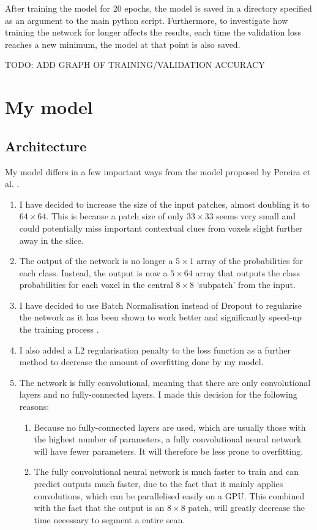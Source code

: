 \documentclass[12pt,a4paper,twoside,openright]{report}
\begin{document}
After training the model for 20 epochs, the model is saved in a directory specified as an argument to the main python script. Furthermore, to investigate how training the network for longer affects the results, each time the validation loss reaches a new minimum, the model at that point is also saved.

TODO: ADD GRAPH OF TRAINING/VALIDATION ACCURACY
\section{My model}
\subsection{Architecture}
My model differs in a few important ways from the model proposed by Pereira et al. \cite{pereira}. 
\begin{enumerate}
	\item I have decided to increase the size of the input patches, almost doubling it to $64 \times 64$. This is because a patch size of only $33 \times 33$ seems very small and could potentially miss important contextual clues from voxels slight further away in the slice.
	\item The output of the network is no longer a $5 \times 1$ array of the probabilities for each class. Instead, the output is now a $5 \times 64$ array that outputs the class probabilities for each voxel in the central $8 \times 8$ `subpatch' from the input. 
	\item I have decided to use Batch Normalisation instead of Dropout to regularise the network as it has been shown to work better and significantly speed-up the training process \cite{batch_normalization}. 
	\item I also added a L2 regularisation penalty to the loss function as a further method to decrease the amount of overfitting done by my model.
	\item The network is fully convolutional, meaning that there are only convolutional layers and no fully-connected layers. I made this decision for the following reasons:
	\begin{enumerate}
		\item Because no fully-connected layers are used, which are usually those with the highest number of parameters, a fully convolutional neural network will have fewer parameters. It will therefore be less prone to overfitting.
		\item The fully convolutional neural network is much faster to train and can predict outputs much faster, due to the fact that it mainly applies convolutions, which can be parallelised easily on a GPU. This combined with the fact that the output is an $8 \times 8$ patch, will greatly decrease the time necessary to segment a entire scan.
	\end{enumerate}
\end{enumerate}
\end{document}
